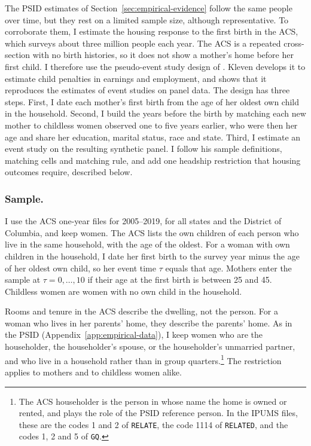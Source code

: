 The PSID estimates of Section~\ref{sec:empirical-evidence} follow the same
people over time, but they rest on a limited sample size, although
representative. To corroborate them, I estimate the housing response to the first
birth in the ACS, which surveys about three
million people each year. The ACS is a repeated cross-section with no birth
histories, so it does not show a mother's home before her first child. I
therefore use the pseudo-event study design of
\citet{klevenGeographyChildPenalties2025}. Kleven develops it to estimate
child penalties in earnings and employment, and shows that it reproduces the
estimates of event studies on panel data. The design has three steps. First,
I date each mother's first birth from the age of her oldest own child in the
household. Second, I build the years before the birth by matching each new
mother to childless women observed one to five years earlier, who were then
her age and share her education, marital status, race and state. Third, I
estimate an event study on the resulting synthetic panel. I follow his sample
definitions, matching cells and matching rule, and add one headship
restriction that housing outcomes require, described below.

\subsubsection*{Sample.}
I use the ACS one-year files for 2005--2019, for all states and the District
of Columbia, and keep women. The ACS lists the own children of each person
who live in the same household, with the age of the oldest. For a woman with
own children in the household, I date her first birth to the survey year
minus the age of her oldest own child, so her event time $\tau$ equals that
age. Mothers enter the sample at $\tau = 0, \dots, 10$ if their age at the
first birth is between 25 and 45. Childless women are women with no own
child in the household.

Rooms and tenure in the ACS describe the dwelling, not the person. For a
woman who lives in her parents' home, they describe the parents' home. As in
the PSID (Appendix~\ref{app:empirical-data}), I keep women who are the
householder, the householder's spouse, or the householder's unmarried
partner, and who live in a household rather than in group
quarters.\footnote{The ACS householder is the person in whose name the home
is owned or rented, and plays the role of the PSID reference person. In the
IPUMS files, these are the codes 1 and 2 of \texttt{RELATE}, the code 1114
of \texttt{RELATED}, and the codes 1, 2 and 5 of \texttt{GQ}.} The
restriction applies to mothers and to childless women alike.

